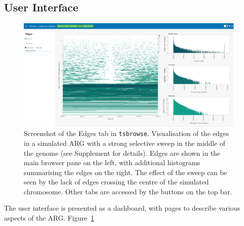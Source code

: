 \documentclass[unnumsec,webpdf,contemporary,large,namedate]{oup-authoring-template}%
\begin{document}
\subsection{User Interface} \label{subsec:User_Interface} \begin{figure}
\centering \includegraphics[width=0.95\linewidth]{figures/MainFig2.png}
\caption{Screenshot of the Edges tab in \texttt{tsbrowse}.
Visualisation of the edges in a simulated ARG with a strong selective
sweep in the middle of the genome (see Supplement for details).
Edges are shown in the main browser pane on the left, with additional
histograms summarising the edges on the right.
The effect of the sweep can be seen by the lack of edges crossing the 
centre of the simulated chromosome. Other tabs are accessed by the 
buttons on the top bar.
\label{fig:Figure_2}}
\end{figure}
The user interface is presented as a dashboard, with pages to
describe various aspects of the ARG. 
Figure~\ref{fig:Figure_2}
\end{document}
